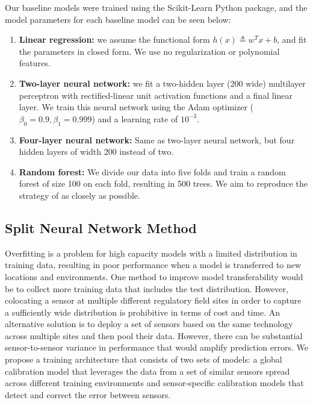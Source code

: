 \documentclass[journal abbreviation, manuscript]{copernicus}
\begin{document}
Our baseline models were trained using the Scikit-Learn Python package, and the model parameters for each baseline model can be seen below:
\begin{enumerate}
    \item \textbf{Linear regression:} we assume the functional form $h(x) \triangleq w^T x + b$, and fit the parameters in closed form. We use no regularization or polynomial features.
    \item \textbf{Two-layer neural network:} we fit a two-hidden layer (200 wide) multilayer perceptron with rectified-linear unit activation functions and a final linear layer. We train this neural network using the Adam optimizer ($\beta_0 = 0.9, \beta_1 = 0.999$) and a learning rate of $10^{-3}$.
    \item \textbf{Four-layer neural network:} Same as two-layer neural network, but four hidden layers of width 200 instead of two.
    \item \textbf{Random forest:} We divide our data into five folds and train a random forest of size 100 on each fold, resulting in 500 trees. We aim to reproduce the strategy of \cite{Zimmerman2018} as closely as possible.
\end{enumerate}

\subsection{Split Neural Network Method}\label{sec:split-nn}
Overfitting is a problem for high capacity models with a limited distribution in training data, resulting in poor performance when a model is transferred to new locations and environments. One method to improve model transferability would be to collect more training data that includes the test distribution. However, colocating a sensor at multiple different regulatory field sites in order to capture a sufficiently wide distribution is prohibitive in terms of cost and time.  An alternative solution is to deploy a set of sensors based on the same technology across multiple sites and then pool their data.  However, there can be substantial sensor-to-sensor variance in performance that would amplify prediction errors.  We propose a training architecture that consists of two sets of models: a global calibration model that leverages the data from a set of similar sensors spread across different training environments and sensor-specific calibration models that detect and correct the error between sensors.
\end{document}
